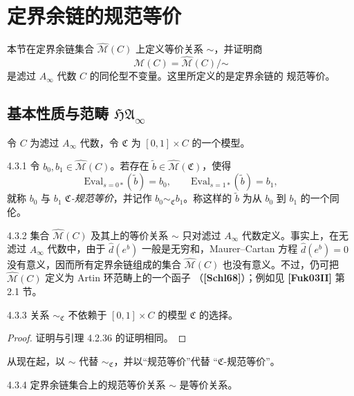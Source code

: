 
\section{定界余链的规范等价}
\label{sec:4-3}

本节在定界余链集合 $\widehat{\mathcal M}(C)$ 上定义等价关系
$\sim$，并证明商
\[
 \mathcal M(C)=\widehat{\mathcal M}(C)/\mathord\sim
\]
是滤过 $A_\infty$ 代数 $C$ 的同伦型不变量。这里所定义的是定界余链的
规范等价。

\subsection{基本性质与范畴 $\mathfrak{HA}_\infty$}
\label{subsec:4-3-1}

令 $C$ 为滤过 $A_\infty$ 代数，令 $\mathfrak C$ 为
$[0,1]\times C$ 的一个模型。

\begin{definition}{4.3.1}\label{def:4-3-1}
令 $b_0,b_1\in\widehat{\mathcal M}(C)$。若存在
$\widetilde b\in\widehat{\mathcal M}(\mathfrak C)$，使得
\[
 \mathrm{Eval}_{s=0*}(\widetilde b)=b_0,
 \qquad
 \mathrm{Eval}_{s=1*}(\widetilde b)=b_1,
\]
就称 $b_0$ 与 $b_1$ \emph{$\mathfrak C$-规范等价}，并记作
$b_0\sim_{\mathfrak C}b_1$。称这样的 $\widetilde b$ 为从 $b_0$ 到
$b_1$ 的一个同伦。
\end{definition}

\begin{remark}{4.3.2}\label{rem:4-3-2}
集合 $\widehat{\mathcal M}(C)$ 及其上的等价关系 $\sim$ 只对滤过
$A_\infty$ 代数定义。事实上，在无滤过 $A_\infty$ 代数中，由于
$\widehat d(e^b)$ 一般是无穷和，Maurer--Cartan 方程
$\widehat d(e^b)=0$ 没有意义，因而所有定界余链组成的集合
$\widehat{\mathcal M}(C)$ 也没有意义。不过，仍可把
$\widehat{\mathcal M}(C)$ 定义为 Artin 环范畴上的一个函子
（\textbf{[Schl68]}）；例如见 \textbf{[Fuk03II]} 第 2.1 节。
\end{remark}

\begin{lemma}{4.3.3}\label{lem:4-3-3}
关系 $\sim_{\mathfrak C}$ 不依赖于 $[0,1]\times C$ 的模型
$\mathfrak C$ 的选择。
\end{lemma}

\begin{proof}
证明与引理 4.2.36 的证明相同。
\end{proof}

从现在起，以 $\sim$ 代替 $\sim_{\mathfrak C}$，并以“规范等价”代替
“$\mathfrak C$-规范等价”。

\begin{lemma}{4.3.4}\label{lem:4-3-4}
定界余链集合上的规范等价关系 $\sim$ 是等价关系。
\end{lemma}

